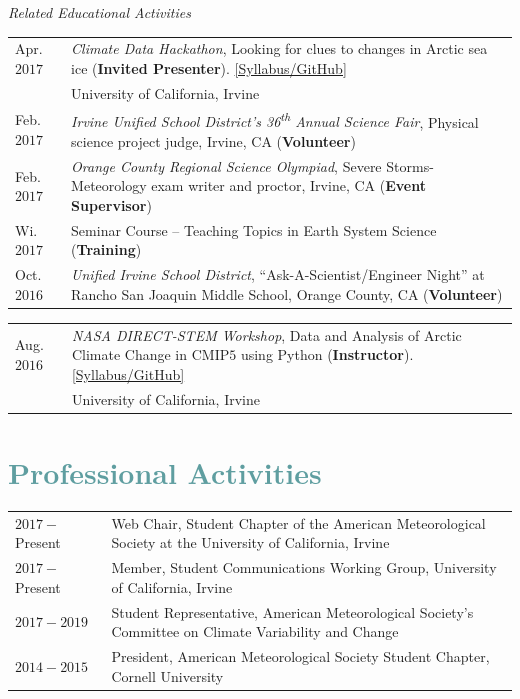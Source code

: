 \documentclass[margin,line,palatino,courier,10pt]{res}
\begin{document}
\begin{resume}
\textit{Related Educational Activities}
\vspace*{0.05in}\\
\begin{tabular}{@{}p{0.8in}p{4in}}
Apr. $2017$ & \textit{Climate Data Hackathon}, Looking for clues to changes in Arctic 
sea ice (\textbf{Invited Presenter}). \href{https://github.com/UCIDataScienceInitiative/Climate_Hackathon}{[Syllabus/GitHub]}\\
& University of California, Irvine\\
Feb. $2017$ & \textit{Irvine Unified School District's 36\textsuperscript{th} Annual Science Fair}, Physical science project judge, Irvine, CA (\textbf{Volunteer})\\
Feb. $2017$ & \textit{Orange County Regional Science Olympiad}, Severe Storms-Meteorology exam writer and proctor, Irvine, CA (\textbf{Event Supervisor})\\
Wi. $2017$ & Seminar Course -- Teaching Topics in Earth System Science (\textbf{Training})\\
Oct. $2016$ & \textit{Unified Irvine School District}, ``Ask-A-Scientist/Engineer Night'' at Rancho San Joaquin Middle School, Orange County, CA (\textbf{Volunteer})\\
\end{tabular}
\newpage
\begin{tabular}{@{}p{0.8in}p{4in}}
Aug. $2016$ & \textit{NASA DIRECT-STEM Workshop}, Data and Analysis of Arctic Climate Change in CMIP$5$ using Python (\textbf{Instructor}). \href{https://github.com/strongh/DIRECT-STEM-climate-workshop}{[Syllabus/GitHub]}\\
& University of California, Irvine\\
\end{tabular}

\vspace{-0.1in}
\noindent\makebox[\linewidth][r]{\rule{\textwidth}{5pt}}
\section{\sc \textcolor{CadetBlue}{\large{Professional Activities}}}
\vspace*{0.05in}
\begin{tabular}{@{}p{0.8in}p{4in}}
$2017 - $Present & Web Chair, Student Chapter of the American Meteorological Society at the University of California, Irvine\\
$2017 - $Present & Member, Student Communications Working Group, University of California, Irvine\\
$2017-2019$ & Student Representative, American Meteorological Society's Committee on Climate Variability and Change\\
$2014-2015$ & President, American Meteorological Society Student Chapter, Cornell University\\
\end{tabular}


\end{resume}
\end{document}
